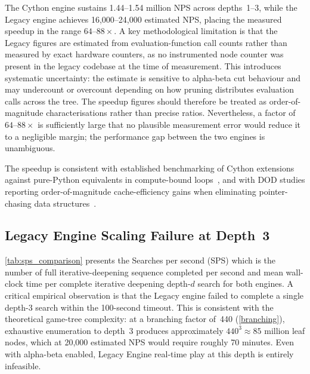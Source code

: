 The Cython engine sustains 1.44--1.54 million NPS across depths~1--3, while the
Legacy engine achieves 16{,}000--24{,}000 estimated NPS, placing the measured
speedup in the range $64$--$88\times$. A key methodological limitation is that the Legacy
figures are estimated from evaluation-function call counts rather than measured by
exact hardware counters, as no instrumented node counter was present in the legacy
codebase at the time of measurement. This introduces systematic uncertainty: the estimate
is sensitive to alpha-beta cut behaviour and may undercount or overcount depending on how
pruning distributes evaluation calls across the tree. The speedup figures should therefore
be treated as order-of-magnitude characterisations rather than precise ratios. Nevertheless,
a factor of $64$--$88\times$ is sufficiently large that no plausible measurement error
would reduce it to a negligible margin; the performance gap between the two engines is
unambiguous.

The speedup is consistent with established benchmarking of Cython extensions against
pure-Python equivalents in compute-bound loops~\cite{behnel2011cython}, and with DOD
studies reporting order-of-magnitude cache-efficiency gains when eliminating
pointer-chasing data structures~\cite{wingqvist2022dod,arantes2025impact}.



\subsection{Legacy Engine Scaling Failure at Depth~3}


\cref{tab:sps_comparison} presents the Searches per second (SPS) which is the number of full iterative-deepening sequence completed per second and mean wall-clock time per complete iterative deepening depth-$d$ search for both engines. A critical empirical observation is that the Legacy
engine failed to complete a single depth-3 search within the
100-second timeout. This is consistent with the theoretical game-tree complexity:
at a branching factor of~440 (\cref{branching}), exhaustive enumeration to depth~3
produces approximately $440^3 \approx 85$ million leaf nodes, which at 20{,}000 estimated
NPS would require roughly 70 minutes. Even with alpha-beta enabled, Legacy Engine real-time play at this depth is
entirely infeasible.

